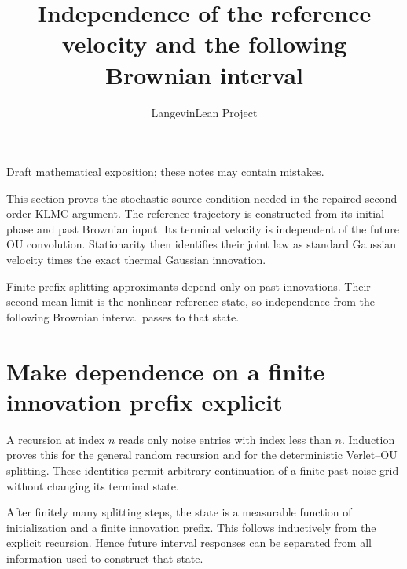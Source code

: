 \documentclass[11pt,a4paper]{article}
\title{\texorpdfstring{Independence of the reference velocity and the following Brownian interval}{Independence of the reference velocity and the following Brownian interval}}
\author{LangevinLean Project}
\date{}
\begin{document}
\maketitle
Draft mathematical exposition; these notes may contain mistakes.


This section proves the stochastic source condition needed in the repaired second-order KLMC argument. The reference trajectory is constructed from its initial phase and past Brownian input. Its terminal velocity is independent of the future OU convolution. Stationarity then identifies their joint law as standard Gaussian velocity times the exact thermal Gaussian innovation.



Finite-prefix splitting approximants depend only on past innovations. Their second-mean limit is the nonlinear reference state, so independence from the following Brownian interval passes to that state.


\section{\texorpdfstring{Make dependence on a finite innovation prefix explicit}{Make dependence on a finite innovation prefix explicit}}


A recursion at index \(n\) reads only noise entries with index less than \(n\). Induction proves this for the general random recursion and for the deterministic Verlet–OU splitting. These identities permit arbitrary continuation of a finite past noise grid without changing its terminal state.



After finitely many splitting steps, the state is a measurable function of initialization and a finite innovation prefix. This follows inductively from the explicit recursion. Hence future interval responses can be separated from all information used to construct that state.
\end{document}

